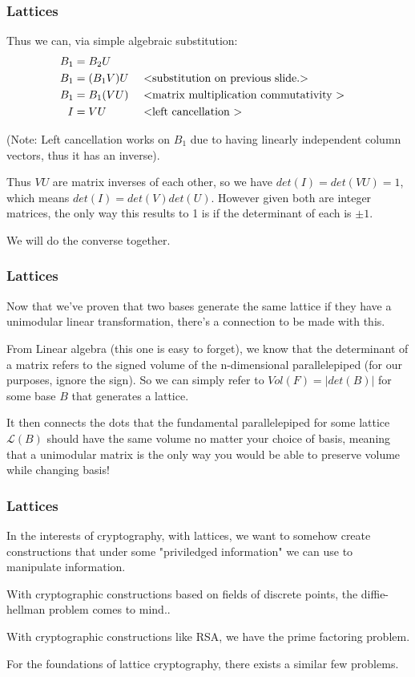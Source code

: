 \documentclass{beamer}
\newcommand{\lat}{\mathcal{L}}
\begin{document}
\begin{frame}
\frametitle{Lattices}
Thus we can, via simple algebraic substitution:
\begin{align*}
B_1 &= B_2U \\
B_1 &= (B_1V)U &&\text{ \textless substitution on previous slide.\textgreater}\\
B_1 &= B_1(VU) &&\text{ \textless matrix multiplication commutativity \textgreater} \\
I &= VU &&\text{ \textless left cancellation \textgreater}
\end{align*}

(Note: Left cancellation works on $B_1$ due to having linearly independent column vectors, thus it has an inverse).

Thus $VU$ are matrix inverses of each other, so we have $det(I) = det(VU) = 1$, which means $det(I) = det(V)det(U)$.
However given both are integer matrices, the only way this results to 1 is if the determinant of each is $\pm 1$.

We will do the converse together.

\end{frame}


\begin{frame}
\frametitle{Lattices}
Now that we've proven that two bases generate the same lattice if they have a unimodular linear transformation, there's a connection to be made with this. 

\vspace{1em}

From Linear algebra (this one is easy to forget), we know that the determinant of a matrix refers to the signed volume of the n-dimensional parallelepiped (for our purposes, ignore the sign). So we can simply refer to $Vol(F) = |det(B)|$ for some base $B$ that generates a lattice. 

\vspace{1em}

It then connects the dots that the fundamental parallelepiped for some lattice $\lat(B)$ should have the same volume no matter your choice of basis, meaning that a unimodular matrix is the only way you would be able to preserve volume while changing basis!

\end{frame}

\begin{frame}
\frametitle{Lattices}
In the interests of cryptography, with lattices, we want to somehow create constructions that under some "priviledged information" we can use to manipulate information. 

With cryptographic constructions based on fields of discrete points, the diffie-hellman problem comes to mind..

With cryptographic constructions like RSA, we have the prime factoring problem.

For the foundations of lattice cryptography, there exists a similar few problems.

\end{frame}
\end{document}
